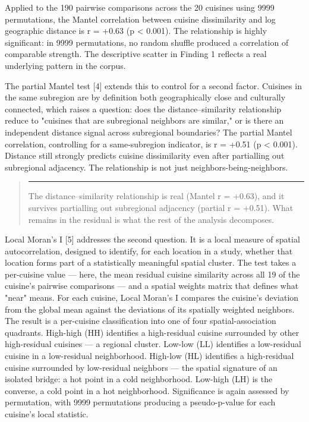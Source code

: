 \documentclass[11pt]{article}
\newenvironment{pullquote}
  {\begin{quote}\itshape\color{black!72}\hspace*{-0.4em}\rule{2pt}{1em}\hspace{0.6em}}
  {\end{quote}}
\begin{document}
Applied to the 190 pairwise comparisons across the 20 cuisines using 9999 permutations, the Mantel correlation between cuisine dissimilarity and log geographic distance is r = +0.63 (p < 0.001). The relationship is highly significant: in 9999 permutations, no random shuffle produced a correlation of comparable strength. The descriptive scatter in Finding 1 reflects a real underlying pattern in the corpus.


The partial Mantel test [4] extends this to control for a second factor. Cuisines in the same subregion are by definition both geographically close and culturally connected, which raises a question: does the distance–similarity relationship reduce to "cuisines that are subregional neighbors are similar," or is there an independent distance signal across subregional boundaries? The partial Mantel correlation, controlling for a same-subregion indicator, is r = +0.51 (p < 0.001). Distance still strongly predicts cuisine dissimilarity even after partialling out subregional adjacency. The relationship is not just neighbors-being-neighbors.


\begin{pullquote}
The distance–similarity relationship is real (Mantel r = +0.63), and it survives partialling out subregional adjacency (partial r = +0.51). What remains in the residual is what the rest of the analysis decomposes.
\end{pullquote}


Local Moran's I [5] addresses the second question. It is a local measure of spatial autocorrelation, designed to identify, for each location in a study, whether that location forms part of a statistically meaningful spatial cluster. The test takes a per-cuisine value — here, the mean residual cuisine similarity across all 19 of the cuisine's pairwise comparisons — and a spatial weights matrix that defines what "near" means. For each cuisine, Local Moran's I compares the cuisine's deviation from the global mean against the deviations of its spatially weighted neighbors. The result is a per-cuisine classification into one of four spatial-association quadrants. High-high (HH) identifies a high-residual cuisine surrounded by other high-residual cuisines — a regional cluster. Low-low (LL) identifies a low-residual cuisine in a low-residual neighborhood. High-low (HL) identifies a high-residual cuisine surrounded by low-residual neighbors — the spatial signature of an isolated bridge: a hot point in a cold neighborhood. Low-high (LH) is the converse, a cold point in a hot neighborhood. Significance is again assessed by permutation, with 9999 permutations producing a pseudo-p-value for each cuisine's local statistic.
\end{document}
